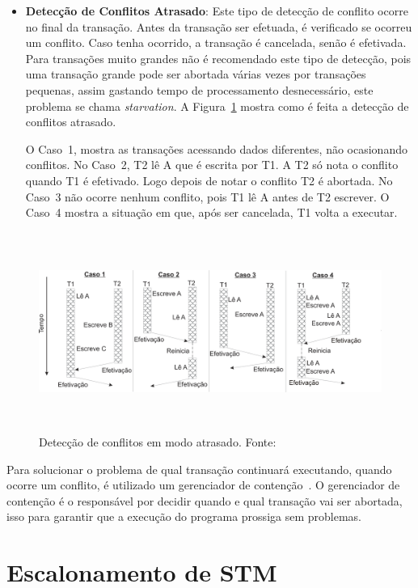 \documentclass[ti]{texufpel}
\begin{document}
\begin{itemize}
\item \textbf{Detecção de Conflitos Atrasado}: Este tipo de detecção de conflito ocorre no final da transação.  Antes da transação ser efetuada, é verificado se ocorreu um conflito. Caso tenha ocorrido, a transação é cancelada, senão é efetivada. Para transações muito grandes não é recomendado este tipo de detecção, pois uma transação grande pode ser abortada várias vezes por transações pequenas, assim gastando tempo de processamento desnecessário, este problema se chama \emph{starvation}. A Figura~\ref{figuradeteccaoatrasado} mostra como é feita a detecção de conflitos atrasado.

O Caso~1, mostra as transações acessando dados diferentes, não ocasionando conflitos. No Caso~2, T2 lê A que é escrita por T1. A T2 só nota o conflito quando T1 é efetivado. Logo depois de notar o conflito T2 é abortada. No Caso~3 não ocorre nenhum conflito, pois T1 lê A antes de T2 escrever. O Caso~4 mostra a situação em que, após ser cancelada, T1 volta a executar.
\end{itemize}

\begin{figure}[!htp]
\centering
\includegraphics[height=6.5cm]{Imagens/conflitoatrasado.png}
\caption{Detecção de conflitos em modo atrasado. Fonte:~\cite{rigo07}}
\label{figuradeteccaoatrasado}
\end{figure}

Para solucionar o problema de qual transação continuará executando, quando ocorre um conflito, é utilizado um gerenciador de contenção~\cite{harris10}. O gerenciador de contenção é o responsável por decidir quando e qual transação vai ser abortada, isso para garantir que a execução do programa prossiga sem problemas.

\chapter{Escalonamento de STM}
\end{document}

